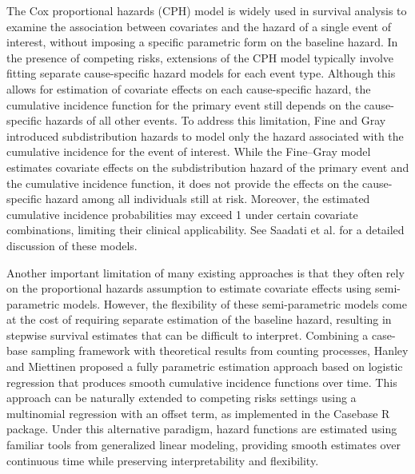 \documentclass[AMA,Times1COL]{WileyNJDv5} %
\begin{document}
The Cox proportional hazards (CPH) model is widely used in survival analysis to examine the association between covariates and the hazard of a single event of interest, without imposing a specific parametric form on the baseline hazard.\cite{Cox:1972} In the presence of competing risks, extensions of the CPH model typically involve fitting separate cause-specific hazard models for each event type.\cite{PrenticeKalbfleischPeterson:1978} Although this allows for estimation of covariate effects on each cause-specific hazard, the cumulative incidence function for the primary event still depends on the cause-specific hazards of all other events. To address this limitation, Fine and Gray introduced subdistribution hazards to model only the hazard associated with the cumulative incidence for the event of interest.\cite{FineGray:1999} While the Fine–Gray model estimates covariate effects on the subdistribution hazard of the primary event and the cumulative incidence function, it does not provide the effects on the cause-specific hazard among all individuals still at risk. Moreover, the estimated cumulative incidence probabilities may exceed 1 under certain covariate combinations, limiting their clinical applicability. See Saadati et al. \cite{SaadatiBeyersmannKopp-Schneider:2018} for a detailed discussion of these models.

Another important limitation of many existing approaches is that they often rely on the proportional hazards assumption to estimate covariate effects using semi-parametric models. However, the flexibility of these semi-parametric models come at the cost of requiring separate estimation of the baseline hazard, resulting in stepwise survival estimates that can be difficult to interpret. Combining a case-base sampling framework with theoretical results from counting processes, Hanley and Miettinen proposed a fully parametric estimation approach based on logistic regression that produces smooth cumulative incidence functions over time.\cite{HanleyMiettinen:2009, Saarela:2016} This approach can be naturally extended to competing risks settings using a multinomial regression with an offset term, as implemented in the Casebase R package.\cite{BhatnagarTurgeonIslam:2022} Under this alternative paradigm, hazard functions are estimated using familiar tools from generalized linear modeling, providing smooth estimates over continuous time while preserving interpretability and flexibility.
\end{document}
